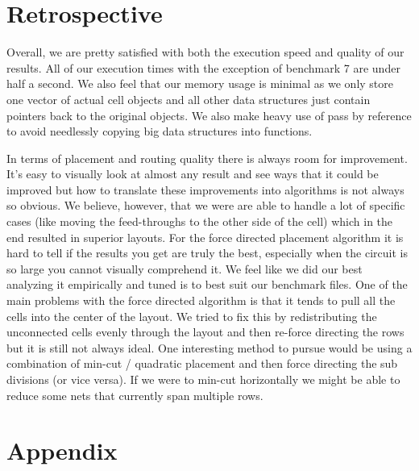 \documentclass[10pt]{article}
\begin{document}
\section{Retrospective}

Overall, we are pretty satisfied with both the execution speed and quality of
our results. All of our execution times with the exception of benchmark 7 are
under half a second. We also feel that our memory usage is minimal as we only
store one vector of actual cell objects and all other data structures just
contain pointers back to the original objects. We also make heavy use of pass
by reference to avoid needlessly copying big data structures into functions.

In terms of placement and routing quality there is always room for improvement.
It's easy to visually look at almost any result and see ways that it could be
improved but how to translate these improvements into algorithms is not always
so obvious. We believe, however, that we were are able to handle a lot of
specific cases (like moving the feed-throughs to the other side of the cell)
which in the end resulted in superior layouts.  For the force directed
placement algorithm it is hard to tell if the results you get are truly the
best, especially when the circuit is so large you cannot visually comprehend
it. We feel like we did our best analyzing it empirically and tuned is to best
suit our benchmark files. One of the main problems with the force directed
algorithm is that it tends to pull all the cells into the center of the layout.
We tried to fix this by redistributing the unconnected cells evenly through the
layout and then re-force directing the rows but it is still not always ideal.
One interesting method to pursue would be using a combination of min-cut /
quadratic placement and then force directing the sub divisions (or vice versa).
If we were to min-cut horizontally we might be able to reduce some nets that
currently span multiple rows.


\newpage
\section{Appendix}
\end{document}
